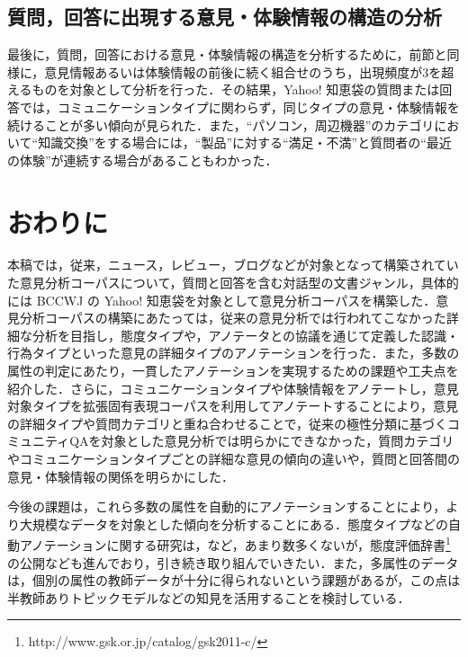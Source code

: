 \documentclass[japanese]{jnlp_1.4}
\begin{document}
\subsection{質問，回答に出現する意見・体験情報の構造の分析}

最後に，質問，回答における意見・体験情報の構造を分析するために，前節と同様に，意見情報あるいは体験情報の前後に続く組合せのうち，出現頻度が3を超えるものを対象として分析を行った．その結果，Yahoo! 知恵袋の質問または回答では，コミュニケーションタイプに関わらず，同じタイプの意見・体験情報を続けることが多い傾向が見られた．また，``パソコン，周辺機器''のカテゴリにおいて``知識交換''をする場合には，``製品''に対する``満足・不満''と質問者の``最近の体験''が連続する場合があることもわかった．


\section{おわりに}
\label{sec:conclusion}

本稿では，従来，ニュース，レビュー，ブログなどが対象となって構築されていた意見分析コーパスについて，質問と回答を含む対話型の文書ジャンル，具体的には BCCWJ の Yahoo! 知恵袋を対象として意見分析コーパスを構築した．意見分析コーパスの構築にあたっては，従来の意見分析では行われてこなかった詳細な分析を目指し，態度タイプ\cite{martin2005}や，アノテータとの協議を通じて定義した認識・行為タイプといった意見の詳細タイプのアノテーションを行った．また，多数の属性の判定にあたり，一貫したアノテーションを実現するための課題や工夫点を紹介した．さらに，コミュニケーションタイプ\cite{kabutoya2008dbsj}や体験情報\cite{seki2008wi2}をアノテートし，意見対象タイプを拡張固有表現コーパス\cite{hasimoto2009nl}を利用してアノテートすることにより，意見の詳細タイプや質問カテゴリと重ね合わせることで，従来の極性分類に基づくコミュニティQAを対象とした意見分析\cite{kucu2012wsdm}では明らかにできなかった，質問カテゴリやコミュニケーションタイプごとの詳細な意見の傾向の違いや，質問と回答間の意見・体験情報の関係を明らかにした．

今後の課題は，これら多数の属性を自動的にアノテーションすることにより，より大規模なデータを対象とした傾向を分析することにある．態度タイプなどの自動アノテーションに関する研究は，など，あまり数多くないが，態度評価辞書\footnote{http://www.gsk.or.jp/catalog/gsk2011-c/} の公開なども進んでおり，引き続き取り組んでいきたい．また，多属性のデータは，個別の属性の教師データが十分に得られないという課題があるが，この点は半教師ありトピックモデル\cite{kim2012icml}などの知見を活用することを検討している．
\end{document}
